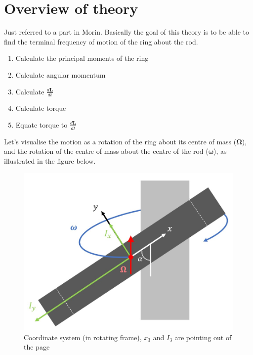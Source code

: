 \documentclass{scrartcl}
\begin{document}
\section{Overview of theory}
Just referred to a part in Morin. Basically the goal of this theory is to be able to find the terminal frequency of motion of the ring about the rod.

\begin{enumerate}
    \item Calculate the principal moments of the ring
    \item Calculate angular momentum
    \item Calculate $\frac{d\mathbf{L}}{dt}$
    \item Calculate torque
    \item Equate torque  to $\frac{d\mathbf{L}}{dt}$
\end{enumerate}

Let's visualise the motion as a rotation of the ring about its centre of mass ($\mathbf{\Omega}$), and the rotation of the centre of mass about the centre of the rod ($\boldsymbol{\omega}$), as illustrated in the figure below.

\begin{figure}[h]
    \centering
    \includegraphics[scale=0.4]{diagram1.jpg}
    \caption{Coordinate system (in rotating frame), $x_3$ and $I_3$ are pointing out of the page}
    \label{2}

\end{figure}
\end{document}
